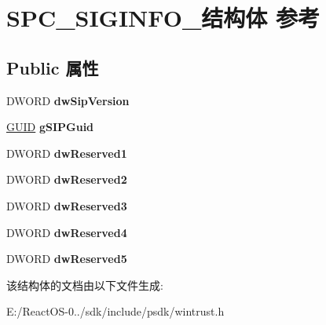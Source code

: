 \hypertarget{struct_s_p_c___s_i_g_i_n_f_o__}{}\section{S\+P\+C\+\_\+\+S\+I\+G\+I\+N\+F\+O\+\_\+结构体 参考}
\label{struct_s_p_c___s_i_g_i_n_f_o__}
\subsection*{Public 属性}
\begin{DoxyCompactItemize}
\item 
\mbox{\label{struct_s_p_c___s_i_g_i_n_f_o___a208d894c2d986dac002ab1ea13f68c18}} 
D\+W\+O\+RD {\bfseries dw\+Sip\+Version}
\item 
\mbox{\label{struct_s_p_c___s_i_g_i_n_f_o___aa4ca92a9885befbe4ad28a923f48f61b}} 
\hyperlink{interface_g_u_i_d}{G\+U\+ID} {\bfseries g\+S\+I\+P\+Guid}
\item 
\mbox{\label{struct_s_p_c___s_i_g_i_n_f_o___a665b3854b41f0b83b200bf8a6fd7523d}} 
D\+W\+O\+RD {\bfseries dw\+Reserved1}
\item 
\mbox{\label{struct_s_p_c___s_i_g_i_n_f_o___a7721ccfdd17713a318cb8376d6800516}} 
D\+W\+O\+RD {\bfseries dw\+Reserved2}
\item 
\mbox{\label{struct_s_p_c___s_i_g_i_n_f_o___a2c1f58de88f856e79edf78ac14e176d2}} 
D\+W\+O\+RD {\bfseries dw\+Reserved3}
\item 
\mbox{\label{struct_s_p_c___s_i_g_i_n_f_o___aaf252abba75dc29fe820e74ea9087cfc}} 
D\+W\+O\+RD {\bfseries dw\+Reserved4}
\item 
\mbox{\label{struct_s_p_c___s_i_g_i_n_f_o___a3cacef838b8895ee854e66d1826d419d}} 
D\+W\+O\+RD {\bfseries dw\+Reserved5}
\end{DoxyCompactItemize}


该结构体的文档由以下文件生成\+:\begin{DoxyCompactItemize}
\item 
E\+:/\+React\+O\+S-\/0../sdk/include/psdk/wintrust.\+h\end{DoxyCompactItemize}
